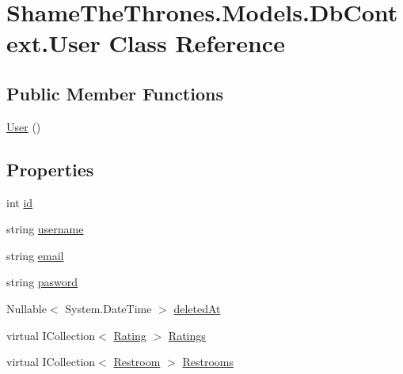 \hypertarget{class_shame_the_thrones_1_1_models_1_1_db_context_1_1_user}{}\section{Shame\+The\+Thrones.\+Models.\+Db\+Context.\+User Class Reference}
\label{class_shame_the_thrones_1_1_models_1_1_db_context_1_1_user}
\subsection*{Public Member Functions}
\begin{DoxyCompactItemize}
\item 
\hyperlink{class_shame_the_thrones_1_1_models_1_1_db_context_1_1_user_a14f4b7c83b120f1a9650a54ad5657b1a}{User} ()
\end{DoxyCompactItemize}
\subsection*{Properties}
\begin{DoxyCompactItemize}
\item 
int \hyperlink{class_shame_the_thrones_1_1_models_1_1_db_context_1_1_user_ab483542b514c3378c39adf0e622baf92}{id}
\item 
string \hyperlink{class_shame_the_thrones_1_1_models_1_1_db_context_1_1_user_a81cb51c92555efac83c8fe8707fd28ea}{username}
\item 
string \hyperlink{class_shame_the_thrones_1_1_models_1_1_db_context_1_1_user_a214cfa1702ca490b2e23b9b952d0c561}{email}
\item 
string \hyperlink{class_shame_the_thrones_1_1_models_1_1_db_context_1_1_user_a1dd862dcbf00ce4d9daac220f0934a72}{pasword}
\item 
Nullable$<$ System.\+Date\+Time $>$ \hyperlink{class_shame_the_thrones_1_1_models_1_1_db_context_1_1_user_a4ef35810ca873f2b763e83215c1883e3}{deleted\+At}
\item 
virtual I\+Collection$<$ \hyperlink{class_shame_the_thrones_1_1_models_1_1_db_context_1_1_rating}{Rating} $>$ \hyperlink{class_shame_the_thrones_1_1_models_1_1_db_context_1_1_user_a3bda22f9a2c17432f0976650f0786ae8}{Ratings}
\item 
virtual I\+Collection$<$ \hyperlink{class_shame_the_thrones_1_1_models_1_1_db_context_1_1_restroom}{Restroom} $>$ \hyperlink{class_shame_the_thrones_1_1_models_1_1_db_context_1_1_user_a341c9f8ef0ec6b9809cd6abc8927727e}{Restrooms}
\end{DoxyCompactItemize}


